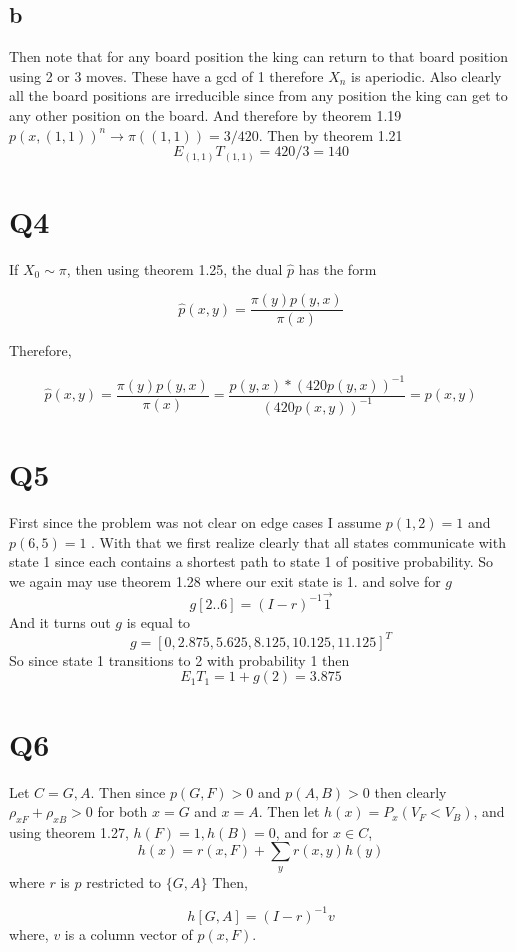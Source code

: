 \documentclass{article}
\begin{document}
\subsection*{b}
Then note that for any board position the king can return to that board position using 2 or 3 moves. These have a gcd of 1 therefore $X_n$ is aperiodic. Also clearly all the board positions are irreducible since from any position the king can get to any other position on the board. And therefore by theorem 1.19 
$p(x, (1,1))^n \rightarrow \pi((1,1)) = 3/420$. 
Then by theorem 1.21 
\[
E_{(1,1)} T_{(1,1)} = 420/3 = 140
\]

\section*{Q4}

If $X_0 \sim \pi$, then using theorem 1.25, the dual $\hat{p}$ has the form

\[
\hat{p}(x,y) = \frac{\pi(y)p(y,x)}{\pi(x)}
\]

Therefore,

\[
\hat{p}(x,y) = \frac{\pi(y)p(y,x)}{\pi(x)} = \frac{p(y,x)*(420p(y,x))^{-1}}{(420p(x,y))^{-1}} = p(x,y)
\]

\section*{Q5}
First since the problem was not clear on edge cases I assume $p(1,2) = 1$ and $p(6,5) = 1$ . With that we first realize clearly that all states communicate with state 1 since each contains a shortest path to state 1 of positive probability. 
So we again may use theorem 1.28 where our exit state is 1. 
and solve for $g$
\[
g[2 .. 6] = (I - r)^{-1} \vec{1}
\]
And it turns out $g$ is equal to 
\[
g = [0 , 2.875,   5.625,   8.125,  10.125,  11.125]^T
\]
So since state 1 transitions to 2 with probability 1 then
\[
E_1T_1 = 1 + g(2) = 3.875
\]

\section*{Q6}
Let $C = {G,A}$. Then since $p(G,F) > 0$ and $p(A,B) > 0$ then clearly $\rho_{xF} + \rho_{xB} > 0 $ for both $x = G$ and $x= A$.
Then let $h(x) = P_x(V_F < V_B)$, and using theorem 1.27,
$h(F) = 1, h(B) = 0$, and for $x \in C$,
\[
h(x) = r(x,F) + \sum_y r(x,y)h(y)
\]
where $r$ is $p$ restricted to $\{G,A\}$
Then,

\[
h[G,A] = (I - r)^{-1}v
\]
where, $v$ is a column vector of $p(x,F)$.
\end{document}
